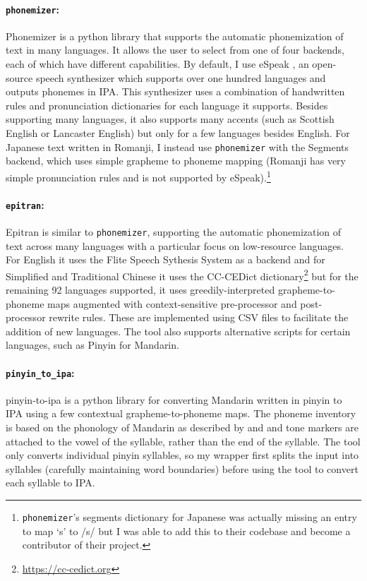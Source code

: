 \paragraph{\texttt{phonemizer}:}
Phonemizer \citep{Bernard2021} is a python library that supports the automatic phonemization of text in many languages. It allows the user to select from one of four backends, each of which have different capabilities. By default, I use eSpeak \citep{Dunn2019}, an open-source speech synthesizer which supports over one hundred languages and outputs phonemes in IPA. This synthesizer uses a combination of handwritten rules and pronunciation dictionaries for each language it supports. Besides supporting many languages, it also supports many accents (such as Scottish English or Lancaster English) but only for a few languages besides English. For Japanese text written in Romanji, I instead use \texttt{phonemizer} with the Segments \citep{robert_forkel_2019_3549784} backend, which uses simple grapheme to phoneme mapping (Romanji has very simple pronunciation rules and is not supported by eSpeak).\footnote{\texttt{phonemizer}'s segments dictionary for Japanese was actually missing an entry to map `s' to /s/ but I was able to add this to their codebase and become a contributor of their project.}

\paragraph{\texttt{epitran}:}
Epitran \citep{Mortensen-et-al:2018} is similar to \texttt{phonemizer}, supporting the automatic phonemization of text across many languages with a particular focus on low-resource languages. For English it uses the Flite Speech Sythesis System \citep{black2001flite} as a backend and for Simplified and Traditional Chinese it uses the CC-CEDict dictionary\footnote{\url{https://cc-cedict.org}} but for the remaining 92 languages supported, it uses greedily-interpreted grapheme-to-phoneme maps augmented with context-sensitive pre-processor and post-processor rewrite rules. These are implemented using CSV files to facilitate the addition of new languages. The tool also supports alternative scripts for certain languages, such as Pinyin for Mandarin.

\paragraph{\texttt{pinyin\_to\_ipa}:} pinyin-to-ipa \citep{taubert_2024_pinyin-to-ipa_2024} is a python library for converting Mandarin written in pinyin to IPA using a few contextual grapheme-to-phoneme maps. The phoneme inventory is based on the phonology of Mandarin as described by \cite{lin2007sounds} and \cite{duanmu2007phonology} and tone markers are attached to the vowel of the syllable, rather than the end of the syllable. The tool only converts individual pinyin syllables, so my wrapper first splits the input into syllables (carefully maintaining word boundaries) before using the tool to convert each syllable to IPA.

